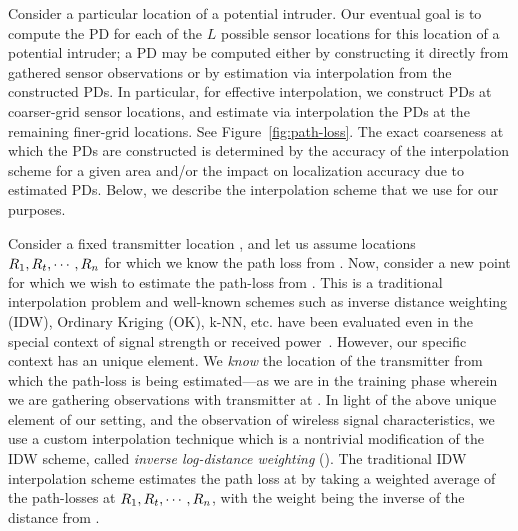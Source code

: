  Consider a particular
location \lstar of a potential intruder. Our eventual goal is to
compute the PD for each of the $L$ possible sensor locations for this
location \lstar of a potential intruder; a PD may be computed either
by constructing it directly from gathered sensor observations or by
estimation via interpolation from the constructed PDs. In particular,
for effective interpolation, we construct PDs at coarser-grid sensor
locations, and estimate via interpolation the PDs at the remaining
finer-grid locations. See Figure~\ref{fig:path-loss}. The exact
coarseness at which the PDs are constructed is determined by the
accuracy of the interpolation scheme for a given area and/or the
impact on localization accuracy due to estimated PDs. Below, we
describe the interpolation scheme that we use for our purposes.

 Consider a fixed transmitter
location \lstar, and let us assume locations $R_1, R_t, \cdots, R_n$ for
which we know the path loss from \lstar. Now, consider a new point \lz
for which we wish to estimate the path-loss from \lstar.
This is a traditional interpolation problem and well-known schemes
such as inverse distance weighting (IDW), Ordinary Kriging (OK), k-NN,
etc. have been evaluated even in the special context of signal
strength or received power~\cite{chakraborty2017specsense}.
However, our specific context has an unique element. We
{\em know} the location \lstar of the transmitter from which the
path-loss is being estimated---as we are in the training phase wherein
we are gathering observations with transmitter at \lstar.
In light of the above unique element of our setting, and the observation of wireless signal characteristics, we use a custom
interpolation technique which is a nontrivial modification of the IDW
scheme, called {\em inverse log-distance weighting} (\ildw). The traditional
IDW interpolation scheme estimates the
path loss at \lz by taking a weighted average of the path-losses at
$R_1, R_t, \cdots, R_n$, with the weight being the inverse of the
distance from \lz. 

